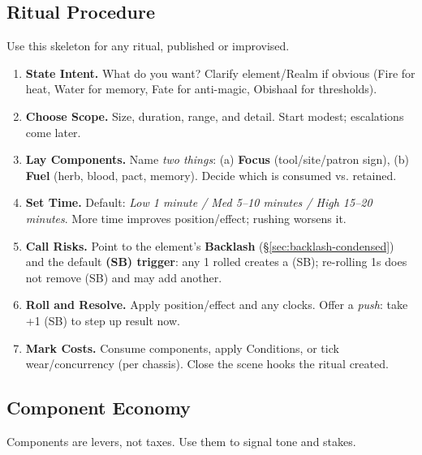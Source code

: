 \subsection{Ritual Procedure}\label{subsec:ritual-procedure}
Use this skeleton for any ritual, published or improvised.

\begin{enumerate}[label=\textbf{Step \arabic*:}, leftmargin=2.2em]
\item \textbf{State Intent.} What do you want? Clarify element/Realm if obvious (Fire for heat, Water for memory, Fate for anti-magic, Obishaal for thresholds).
\item \textbf{Choose Scope.} Size, duration, range, and detail. Start modest; escalations come later.
\item \textbf{Lay Components.} Name \emph{two things}: (a) \textbf{Focus} (tool/site/patron sign), (b) \textbf{Fuel} (herb, blood, pact, memory). Decide which is consumed vs. retained.
\item \textbf{Set Time.} Default: \emph{Low 1 minute / Med 5–10 minutes / High 15–20 minutes}. More time improves position/effect; rushing worsens it.
\item \textbf{Call Risks.} Point to the element's \textbf{Backlash} (\S\ref{sec:backlash-condensed}) and the default \textbf{(SB) trigger}: any 1 rolled creates a (SB); re-rolling 1s does not remove (SB) and may add another.
\item \textbf{Roll and Resolve.} Apply position/effect and any clocks. Offer a \emph{push}: take +1 (SB) to step up result now.
\item \textbf{Mark Costs.} Consume components, apply Conditions, or tick wear/concurrency (per chassis). Close the scene hooks the ritual created.
\end{enumerate}

\subsection{Component Economy}\label{subsec:component-economy}
Components are levers, not taxes. Use them to signal tone and stakes.

